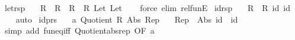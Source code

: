 \begin{isabellebody}
\isanewline
%
\endisadelimproof
\isanewline
{}\isamarkupfalse%
\ let{\isacharunderscore}{\kern0pt}rsp{\isacharcolon}{\kern0pt}\isanewline
\ \ \ {\isachardoublequoteopen}{\isacharparenleft}{\kern0pt}R{}\ {\isacharequal}{\kern0pt}{\isacharequal}{\kern0pt}{\isacharequal}{\kern0pt}{\isachargreater}{\kern0pt}\ {\isacharparenleft}{\kern0pt}R{}\ {\isacharequal}{\kern0pt}{\isacharequal}{\kern0pt}{\isacharequal}{\kern0pt}{\isachargreater}{\kern0pt}\ R{}{\isacharparenright}{\kern0pt}\ {\isacharequal}{\kern0pt}{\isacharequal}{\kern0pt}{\isacharequal}{\kern0pt}{\isachargreater}{\kern0pt}\ R{}{\isacharparenright}{\kern0pt}\ Let\ Let{\isachardoublequoteclose}\isanewline
%
\isadelimproof
\ \ %
\endisadelimproof
%
\isatagproof
{}\isamarkupfalse%
\ {\isacharparenleft}{\kern0pt}force\ elim{\isacharcolon}{\kern0pt}\ rel{\isacharunderscore}{\kern0pt}funE{\isacharparenright}{\kern0pt}%
\endisatagproof
{\isafoldproof}%
%
\isadelimproof
\isanewline
%
\endisadelimproof
\isanewline
{}\isamarkupfalse%
\ id{\isacharunderscore}{\kern0pt}rsp{\isacharcolon}{\kern0pt}\isanewline
\ \ \ {\isachardoublequoteopen}{\isacharparenleft}{\kern0pt}R\ {\isacharequal}{\kern0pt}{\isacharequal}{\kern0pt}{\isacharequal}{\kern0pt}{\isachargreater}{\kern0pt}\ R{\isacharparenright}{\kern0pt}\ id\ id{\isachardoublequoteclose}\isanewline
%
\isadelimproof
\ \ %
\endisadelimproof
%
\isatagproof
{}\isamarkupfalse%
\ auto%
\endisatagproof
{\isafoldproof}%
%
\isadelimproof
\isanewline
%
\endisadelimproof
\isanewline
{}\isamarkupfalse%
\ id{\isacharunderscore}{\kern0pt}prs{\isacharcolon}{\kern0pt}\isanewline
\ \ \ a{\isacharcolon}{\kern0pt}\ {\isachardoublequoteopen}Quotient{}\ R\ Abs\ Rep{\isachardoublequoteclose}\isanewline
\ \ \ {\isachardoublequoteopen}{\isacharparenleft}{\kern0pt}Rep\ {\isacharminus}{\kern0pt}{\isacharminus}{\kern0pt}{\isacharminus}{\kern0pt}{\isachargreater}{\kern0pt}\ Abs{\isacharparenright}{\kern0pt}\ id\ {\isacharequal}{\kern0pt}\ id{\isachardoublequoteclose}\isanewline
%
\isadelimproof
\ \ %
\endisadelimproof
%
\isatagproof
{}\isamarkupfalse%
\ {\isacharparenleft}{\kern0pt}simp\ add{\isacharcolon}{\kern0pt}\ fun{\isacharunderscore}{\kern0pt}eq{\isacharunderscore}{\kern0pt}iff\ Quotient{}{\isacharunderscore}{\kern0pt}abs{\isacharunderscore}{\kern0pt}rep\ {\isacharbrackleft}{\kern0pt}OF\ a{\isacharbrackright}{\kern0pt}{\isacharparenright}{\kern0pt}%
\endisatagproof

\end{isabellebody}
